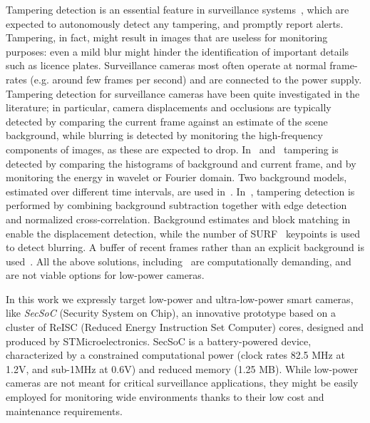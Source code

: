 \documentclass{llncs}
\begin{document}
Tampering detection is an essential feature in surveillance systems~\cite{hampapur2005smart}, which are expected to autonomously detect any tampering, and promptly report alerts. Tampering, in fact, might result in images that are useless for monitoring purposes: even a mild blur might hinder the identification of important details such as licence plates. Surveillance cameras most often operate at normal frame-rates (e.g. around few frames per second) and are connected to the power supply. Tampering detection for surveillance cameras have been quite investigated in the literature; in particular, camera displacements and occlusions are typically detected by comparing the current frame against an estimate of the scene background, while blurring is detected by monitoring the high-frequency components of images, as these are expected to drop. In~\cite{aksay2007camera} and~\cite{saglam2009real} tampering is detected by comparing the histograms of background and current frame, and by monitoring the energy in wavelet or Fourier domain. Two background models, estimated over different time intervals, are used in~\cite{saglam2009real}. In~\cite{gil2007automatic}, tampering detection is performed by combining background subtraction together with edge detection and normalized cross-correlation. Background estimates and block matching in~\cite{tsesmelis2013tamper} enable the displacement detection, while the number of SURF~\cite{bay2006surf} keypoints is used to detect blurring. A buffer of recent frames rather than an explicit background is used~\cite{ribnick2006real}. All the above solutions, including~\cite{harasse2004automated,kryjak2012fpga} are computationally demanding, and are not viable options for low-power cameras.

In this work we expressly target low-power and ultra-low-power smart cameras, like \emph{SecSoC} (Security System on Chip), an innovative prototype based on a cluster of ReISC (Reduced Energy Instruction Set Computer) cores, designed and produced by STMicroelectronics. SecSoC is a battery-powered device, characterized by a constrained computational power (clock rates 82.5 MHz at 1.2V, and sub-1MHz at 0.6V) and reduced memory (1.25 MB). While low-power cameras are not meant for critical surveillance applications, they might be easily employed for monitoring wide environments thanks to their low cost and maintenance requirements.  %
\end{document}
